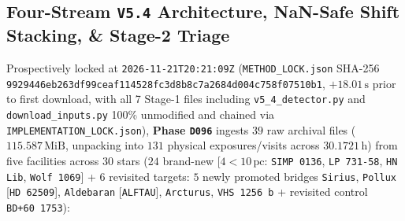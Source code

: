 \documentclass[twocolumn,10pt]{article}
\begin{document}
\subsection{Four-Stream \texttt{V5.4} Architecture, NaN-Safe Shift Stacking, \& Stage-2 Triage}
Prospectively locked at \texttt{2026-11-21T20:21:09Z} (\texttt{METHOD\_LOCK.json} SHA-256 \texttt{9929446e\allowbreak b263df99\allowbreak ceaf1145\allowbreak 28fc3d8b\allowbreak 8c7a2684\allowbreak d004c758\allowbreak f07510b1}, $+18.01\,\text{s}$ prior to first download, with all 7 Stage-1 files including \texttt{v5\_4\_detector.py} and \texttt{download\_inputs.py} 100\% unmodified and chained via \texttt{IMPLEMENTATION\_LOCK.json}), \textbf{Phase \texttt{D096}} ingests $39$ raw archival files ($115.587\,\text{MiB}$, unpacking into $131$ physical exposures/visits across $30.1721\,\text{h}$) from five facilities across $30$ stars ($24$ brand-new [$4 < 10\,\text{pc}$: \texttt{SIMP\,0136}, \texttt{LP\,731-58}, \texttt{HN\,Lib}, \texttt{Wolf\,1069}] + $6$ revisited targets: $5$ newly promoted bridges \texttt{Sirius}, \texttt{Pollux} [\texttt{HD\,62509}], \texttt{Aldebaran} [\texttt{ALFTAU}], \texttt{Arcturus}, \texttt{VHS\,1256\,b} + revisited control \texttt{BD+60\,1753}):
\end{document}
